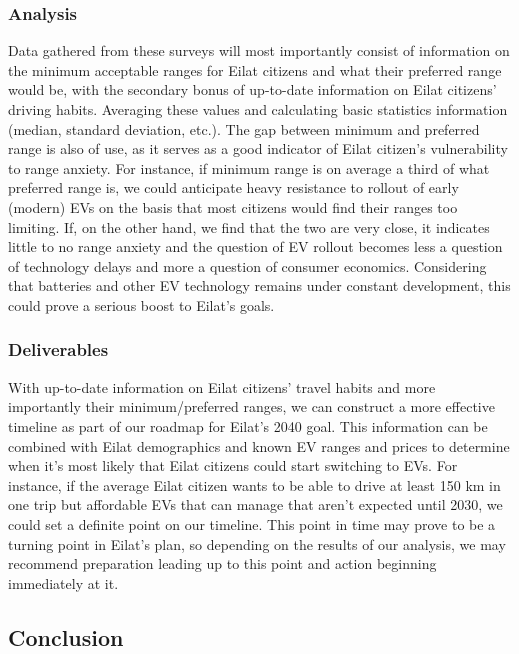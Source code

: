\documentclass{article}                         %
\begin{document}
\subsubsection{Analysis}
Data gathered from these surveys will most importantly consist of information on the minimum acceptable ranges for Eilat citizens and what their preferred range would be, with the secondary bonus of up-to-date information on Eilat citizens' driving habits. Averaging these values and calculating basic statistics information (median, standard deviation, etc.). The gap between minimum and preferred range is also of use, as it serves as a good indicator of Eilat citizen's vulnerability to range anxiety. For instance, if minimum range is on average a third of what preferred range is, we could anticipate heavy resistance to rollout of early (modern) EVs on the basis that most citizens would find their ranges too limiting. If, on the other hand, we find that the two are very close, it indicates little to no range anxiety and the question of EV rollout becomes less a question of technology delays and more a question of consumer economics. Considering that batteries and other EV technology remains under constant development, this could prove a serious boost to Eilat's goals.

\subsubsection{Deliverables}
With up-to-date information on Eilat citizens' travel habits and more importantly their minimum/preferred ranges, we can construct a more effective timeline as part of our roadmap for Eilat's 2040 goal. This information can be combined with Eilat demographics and known EV ranges and prices to determine when it's most likely that Eilat citizens could start switching to EVs. For instance, if the average Eilat citizen wants to be able to drive at least 150 km in one trip but affordable EVs that can manage that aren't expected until 2030, we could set a definite point on our timeline. This point in time may prove to be a turning point in Eilat's plan, so depending on the results of our analysis, we may recommend preparation leading up to this point and action beginning immediately at it.

\subsection{Conclusion}


\newpage
\bigskip


\end{document}
